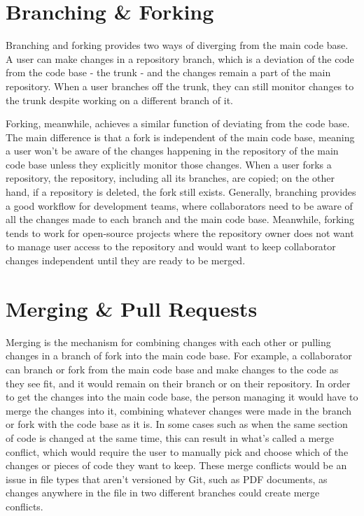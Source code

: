 \section{Branching \& Forking}
Branching and forking provides two ways of diverging from the main code base. A user can make changes in a repository branch, which is a deviation of the code from the code base - the trunk - and the changes remain a part of the main repository. When a user branches off the trunk, they can still monitor changes to the trunk despite working on a different branch of it.

Forking, meanwhile, achieves a similar function of deviating from the code base. The main difference is that a fork is independent of the main code base, meaning a user won't be aware of the changes happening in the repository of the main code base unless they explicitly monitor those changes. When a user forks a repository, the repository, including all its branches, are copied; on the other hand, if a repository is deleted, the fork still exists. Generally, branching provides a good workflow for development teams, where collaborators need to be aware of all the changes made to each branch and the main code base. Meanwhile, forking tends to work for open-source projects where the repository owner does not want to manage user access to the repository and would want to keep collaborator changes independent until they are ready to be merged.

\section{Merging \& Pull Requests}
Merging is the mechanism for combining changes with each other or pulling changes in a branch of fork into the main code base. For example, a collaborator can branch or fork from the main code base and make changes to the code as they see fit, and it would remain on their branch or on their repository. In order to get the changes into the main code base, the person managing it would have to merge the changes into it, combining whatever changes were made in the branch or fork with the code base as it is. In some cases such as when the same section of code is changed at the same time, this can result in what's called a merge conflict, which would require the user to manually pick and choose which of the changes or pieces of code they want to keep. These merge conflicts would be an issue in file types that aren't versioned by Git, such as PDF documents, as changes anywhere in the file in two different branches could create merge conflicts.

